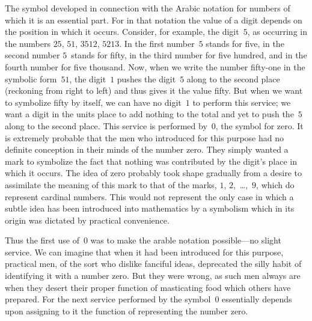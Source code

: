 \documentclass[12pt,leqno]{book}[2005/09/16]
\newcommand{\Chg}[2]{#2}
\newcommand{\Add}[1]{\Chg{}{#1}}
\newcommand{\PageSep}[1]{\ignorespaces}
\begin{document}
The symbol developed in connection with
the Arabic notation for numbers of which it
is an essential part. For in that notation the
\PageSep{64}
value of a digit depends on the position in
which it occurs. Consider, for example, the
digit~$5$, as occurring in the numbers $25$, $51$,
$3512$, $5213$. In the first number~$5$ stands for
five, in the second number $5$~stands for fifty,
in the third number for five hundred, and in
the fourth number for five thousand. Now,
when we write the number fifty-one in the
symbolic form~$51$, the digit~$1$ pushes the digit~$5$
along to the second place (reckoning from
right to left) and thus gives it the value fifty.
But when we want to symbolize fifty by itself,
we can have no digit~$1$ to perform this service;
we want a digit in the units place to add
nothing to the total and yet to push the~$5$
along to the second place. This service is
performed by~$0$, the symbol for zero. It is
extremely probable that the men who introduced
for this purpose had no definite conception
in their minds of the number zero.
They simply wanted a mark to symbolize the
fact that nothing was contributed by the
digit's place in which it occurs. The idea of
zero probably took shape gradually from a
desire to assimilate the meaning of this mark
to that of the marks, $1$, $2$,~\dots\Add{,}~$9$, which do represent
cardinal numbers. This would not
represent the only case in which a subtle idea
has been introduced into mathematics by a
symbolism which in its origin was dictated by
practical convenience.
\PageSep{65}

Thus the first use of~$0$ was to make the
arable notation possible---no slight service.
We can imagine that when it had been introduced
for this purpose, practical men, of the
sort who dislike fanciful ideas, deprecated the
silly habit of identifying it with a number
zero. But they were wrong, as such men
always are when they desert their proper
function of masticating food which others have
prepared. For the next service performed by
the symbol~$0$ essentially depends upon assigning
to it the function of representing the
number zero.
\end{document}
